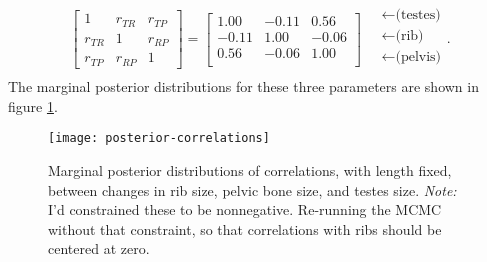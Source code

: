 \documentclass{article}
\begin{document}
\begin{align}
\begin{bmatrix}
  1 & r_{TR} & r_{TP} \\ 
  r_{TR} & 1 & r_{RP} \\ 
  r_{TP} & r_{RP} & 1 
 \end{bmatrix}
 =
\begin{bmatrix}
   1.00 & -0.11 & 0.56 \\ 
   -0.11 & 1.00 & -0.06 \\ 
   0.56 & -0.06 & 1.00 \\ 
 \end{bmatrix}
\quad \begin{matrix}
  \leftarrow \text{(testes)} \\
  \leftarrow \text{(rib)} \\
  \leftarrow \text{(pelvis)} \\
\end{matrix}  .
\end{align}
The marginal posterior distributions for these three parameters
are shown in figure \ref{fig:posterior_cors}.

\begin{figure}[ht]
  \begin{center}
    \texttt{[image: posterior-correlations]}
  \end{center}
  \caption{Marginal posterior distributions of correlations, with length fixed,
  between changes in rib size, pelvic bone size, and testes size.
  \emph{Note:} I'd constrained these to be nonnegative.  
  Re-running the MCMC without that constraint, so that correlations with ribs should be centered at zero.
  \label{fig:posterior_cors}
  }
\end{figure}
\end{document}
